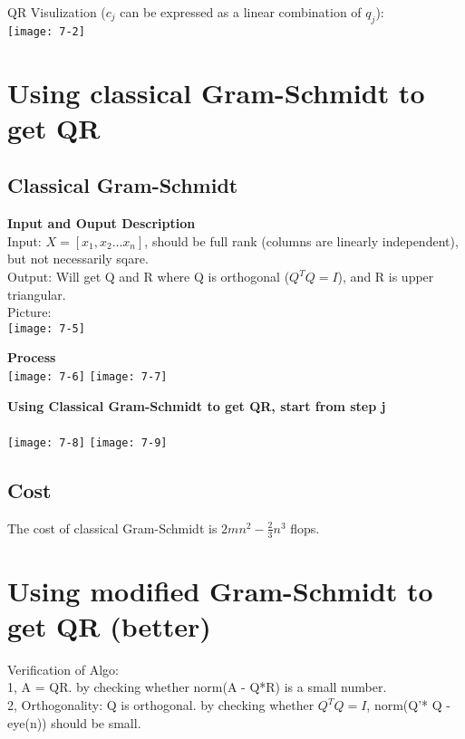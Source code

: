 \documentclass{article}
\begin{document}
QR Visulization ($c_j$ can be expressed as a linear combination of $q_j$):\\
\texttt{[image: 7-2]}

\pagebreak

\section{Using classical Gram-Schmidt to get QR}

\subsection*{Classical Gram-Schmidt}
\medskip
\textbf{Input and Ouput Description}\\
Input: $X = \left[x_1,x_2...x_n\right]$, should be full rank (columns are linearly independent), but not
necessarily sqare.\\

\noindent
Output: Will get Q and R where Q is orthogonal ($Q^TQ = I$), and R is upper triangular.\\

\noindent
Picture:\\
\texttt{[image: 7-5]}

\noindent
\textbf{Process}\\
\texttt{[image: 7-6]}
\texttt{[image: 7-7]}

\pagebreak
\noindent
\textbf{Using Classical Gram-Schmidt to get QR, start from step j}\\
\\
\texttt{[image: 7-8]}
\texttt{[image: 7-9]}



\subsection*{Cost}
The cost of classical Gram-Schmidt is $2mn^2 - \frac{2}{3}n^3$ flops.\\

\pagebreak
\section{Using modified Gram-Schmidt to get QR (better)}

\noindent
Verification of Algo:\\
1, A = QR. by checking whether norm(A - Q*R) is a small number.\\
2, Orthogonality: Q is orthogonal. by checking whether $Q^TQ = I$, norm(Q'* Q - eye(n)) should be small.
\end{document}
